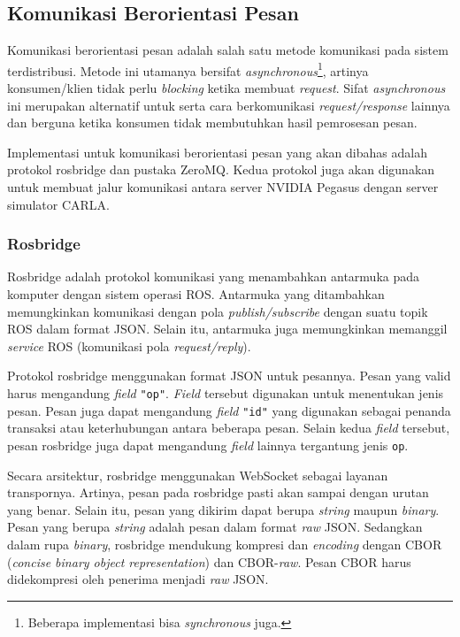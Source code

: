 \subsection{Komunikasi Berorientasi Pesan}

Komunikasi berorientasi pesan adalah salah satu metode komunikasi pada sistem
terdistribusi. Metode ini utamanya bersifat
\textit{asynchronous}\footnote{Beberapa implementasi bisa \textit{synchronous}
    juga.}, artinya konsumen/klien tidak perlu \textit{blocking} ketika membuat
\textit{request}. Sifat \textit{asynchronous} ini merupakan alternatif untuk
serta cara berkomunikasi \textit{request/response} lainnya dan berguna ketika
konsumen tidak membutuhkan hasil pemrosesan pesan.

Implementasi untuk komunikasi berorientasi pesan yang akan dibahas adalah
protokol rosbridge dan pustaka ZeroMQ. Kedua protokol juga akan digunakan untuk
membuat jalur komunikasi antara server NVIDIA Pegasus dengan server simulator
CARLA.

\subsubsection{Rosbridge}

Rosbridge adalah protokol komunikasi yang menambahkan antarmuka pada komputer
dengan sistem operasi ROS. Antarmuka yang ditambahkan memungkinkan komunikasi
dengan pola \textit{publish/subscribe} dengan suatu topik ROS dalam format JSON.
Selain itu, antarmuka juga memungkinkan memanggil \textit{service} ROS
(komunikasi pola \textit{request/reply}).

Protokol rosbridge menggunakan format JSON untuk pesannya. Pesan yang valid
harus mengandung \textit{field} \texttt{"op"}. \textit{Field} tersebut digunakan
untuk menentukan jenis pesan. Pesan juga dapat mengandung \textit{field}
\texttt{"id"} yang digunakan sebagai penanda transaksi atau keterhubungan antara
beberapa pesan. Selain kedua \textit{field} tersebut, pesan rosbridge juga dapat
mengandung \textit{field} lainnya tergantung jenis \texttt{op}.

Secara arsitektur, rosbridge menggunakan WebSocket sebagai layanan
trans\-por\-nya. Artinya, pesan pada rosbridge pasti akan sampai dengan urutan
yang benar. Selain itu, pesan yang dikirim dapat berupa \textit{string} maupun
\textit{binary}. Pesan yang berupa \textit{string} adalah pesan dalam format
\textit{raw} JSON. Sedangkan dalam rupa \textit{binary}, rosbridge mendukung
kompresi dan \textit{encoding} dengan CBOR (\textit{concise binary object
    representation}) dan CBOR-\textit{raw}. Pesan CBOR harus didekompresi oleh
penerima menjadi \textit{raw} JSON.

